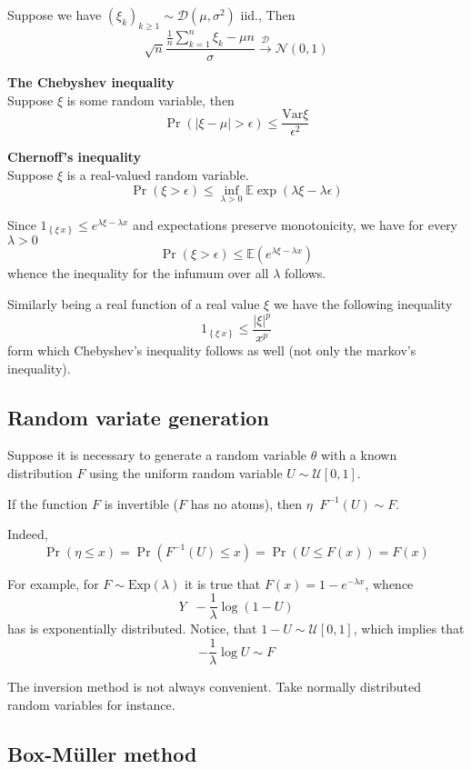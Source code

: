 \documentclass[a4paper]{article}
\newcommand{\obj}[1]{{\left\{ #1 \right \}}}
\newcommand{\clo}[1]{{\left [ #1 \right ]}}
\newcommand{\brac}[1]{{\left ( #1 \right )}}
\newcommand{\abs}[1]{{\left | #1 \right |}}
\newcommand{\Ex}{\mathbb{E}}
\newcommand{\Var}{\text{Var}}
\newcommand{\defn}{\mathop{\overset{\Delta}{=}}\nolimits}
\begin{document}
Suppose we have $\brac{\xi_k}_{k\geq1}\sim \mathcal{D}(\mu, \sigma^2)$ iid., Then
\[\sqrt{n}\frac{\frac{1}{n}\sum_{k=1}^n \xi_k - \mu n}{\sigma} \overset{\mathcal{D}}{\to} \mathcal{N}(0,1)\]

\noindent\textbf{The Chebyshev inequality}\hfill\\
Suppose $\xi$ is some random variable, then 
\[\Pr\brac{\abs{\xi-\mu}> \epsilon}\leq \frac{\Var{\xi}}{\epsilon^2}\] 

\noindent\textbf{Chernoff's inequality}\hfill\\
Suppose $\xi$ is a real-valued random variable.
\[\Pr\brac{\xi>\epsilon}\leq \inf_{\lambda>0} \Ex\exp\brac{\lambda\xi - \lambda\epsilon}\]

Since $1_\obj{\xi\>x}\leq e^{\lambda \xi - \lambda x}$ and expectations preserve monotonicity, we have for every $\lambda>0$
\[\Pr\brac{\xi>\epsilon}\leq \Ex\brac{e^{\lambda \xi - \lambda x}}\]
whence the inequality for the infumum over all $\lambda$ follows.

Similarly being a real function of a real value $\xi$ we have the following inequality
\[1_\obj{\xi\>x}\leq \frac{\abs{\xi}^p}{x^p}\]
form which Chebyshev's inequality follows as well (not only the markov's inequality).

\subsection{Random variate generation} %
\label{sub:random_variate_generation}

Suppose it is necessary to generate a random variable $\theta$ with a known distribution $F$ using the uniform random variable $U\sim\mathcal{U}\clo{0,1}$.

If the function $F$ is invertible ($F$ has no atoms), then $\eta \defn F^{-1}(U)\sim F$.

Indeed, \[\Pr\brac{\eta\leq x} = \Pr\brac{F^{-1}(U)\leq x} = \Pr\brac{U\leq F(x)} = F(x)\]

For example, for $F\sim \text{Exp}(\lambda)$ it is true that $F(x)= 1-e^{-\lambda x}$, whence \[Y \defn -\frac{1}{\lambda}\log{(1-U)}\] has is exponentially distributed. Notice, that $1-U\sim\mathcal{U}\clo{0,1}$, which implies that \[-\frac{1}{\lambda}\log U \sim F\]

The inversion method is not always convenient. Take normally distributed random variables for instance.


\subsection{Box-M\"uller method} %
\label{sub:box_muller_method}
\end{document}
